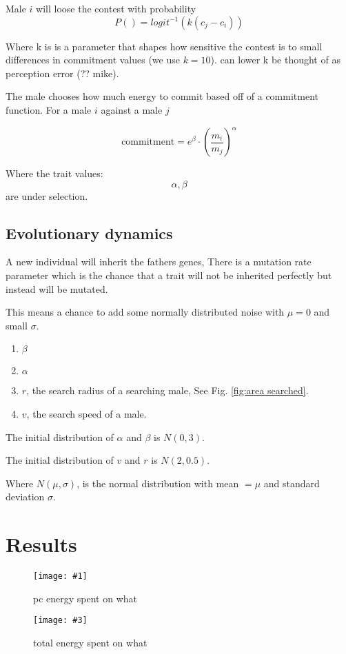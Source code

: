 \documentclass[a4paper,11pt]{article}
\newcommand{\myfigure}[4]{
\begin{figure}[h!]
    \centering
    \texttt{[image: \#1]}
    \caption{#2}
    \centering
    \texttt{[image: \#3]}
    \caption{#4}
\end{figure}
}
\begin{document}
Male $i$ will loose the contest with probability 
$$P(\text{})= logit^{-1}(k(c_j - c_i))$$

Where k is is a parameter that shapes how sensitive the contest is to small differences in commitment values (we use $k = 10$).
can lower k be thought of as perception error (?? mike).

The male chooses how much energy to commit based off of a commitment function. For a male $i$ against a male $j$

$$\text{commitment} = e^\beta \cdot (\frac{m_i}{m_j})^\alpha $$

Where the trait values:
$$\alpha , \beta$$
are under selection.

\clearpage

\subsection{Evolutionary dynamics}

A new individual will inherit the fathers genes,
There is a mutation rate parameter which is the chance that a trait will not be inherited perfectly but instead will be mutated.

This means a chance to add some normally distributed noise with $\mu = 0$ and small $\sigma$.


\begin{enumerate}
    \item $\beta$
    \item $\alpha$
    \item $r$, the search radius of a searching male, See Fig. \ref{fig:area searched}.
    \item $v$, the search speed of a male.
\end{enumerate}

The initial distribution of $\alpha$ and $\beta$ is $N(0, 3)$.

The initial distribution of $v$ and $r$ is $N(2, 0.5)$.

Where $N(\mu, \sigma)$, is the normal distribution with mean $= \mu$ and standard deviation $\sigma$.

\section{Results} %
\label{sec:results}

\myfigure{figures/energy_pc_plot_cm_100.png}{pc energy spent on what}{figures/energy_total_plot_cm_100.png}{total energy spent on what}
\end{document}
